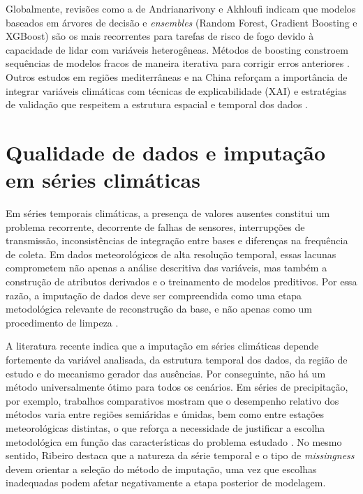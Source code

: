 Globalmente, revisões como a de Andrianarivony e Akhloufi \cite{andrianarivony2024review} indicam que modelos baseados em árvores de decisão e \textit{ensembles} (Random Forest, Gradient Boosting e XGBoost) são os mais recorrentes para tarefas de risco de fogo devido à capacidade de lidar com variáveis heterogêneas. Métodos de boosting constroem sequências de modelos fracos de maneira iterativa para corrigir erros anteriores \cite{friedman2001greedy}. Outros estudos em regiões mediterrâneas e na China reforçam a importância de integrar variáveis climáticas com técnicas de explicabilidade (XAI) e estratégias de validação que respeitem a estrutura espacial e temporal dos dados \cite{cilli2022xai, pang2022china, ahajjam2025wildfire}.

\section{Qualidade de dados e imputação em séries climáticas}
\label{sec:imputacao_series_climaticas}

Em séries temporais climáticas, a presença de valores ausentes constitui um problema recorrente, decorrente de falhas de sensores, interrupções de transmissão, inconsistências de integração entre bases e diferenças na frequência de coleta. Em dados meteorológicos de alta resolução temporal, essas lacunas comprometem não apenas a análise descritiva das variáveis, mas também a construção de atributos derivados e o treinamento de modelos preditivos. Por essa razão, a imputação de dados deve ser compreendida como uma etapa metodológica relevante de reconstrução da base, e não apenas como um procedimento de limpeza \cite{alejosanchez2025review,ribeiro2021imputation,afridayamoah2020imputation}.

A literatura recente indica que a imputação em séries climáticas depende fortemente da variável analisada, da estrutura temporal dos dados, da região de estudo e do mecanismo gerador das ausências. Por conseguinte, não há um método universalmente ótimo para todos os cenários. Em séries de precipitação, por exemplo, trabalhos comparativos mostram que o desempenho relativo dos métodos varia entre regiões semiáridas e úmidas, bem como entre estações meteorológicas distintas, o que reforça a necessidade de justificar a escolha metodológica em função das características do problema estudado \cite{navarro2023precipitation,alejosanchez2025review}. No mesmo sentido, Ribeiro \cite{ribeiro2021imputation} destaca que a natureza da série temporal e o tipo de \textit{missingness} devem orientar a seleção do método de imputação, uma vez que escolhas inadequadas podem afetar negativamente a etapa posterior de modelagem.

